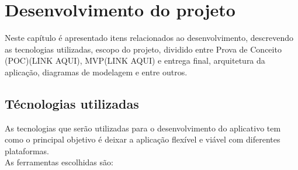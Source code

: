 \chapter{Desenvolvimento do projeto}
Neste capítulo é apresentado itens relacionados ao desenvolvimento, descrevendo as tecnologias utilizadas, escopo do projeto, dividido entre Prova de Conceito (POC)(LINK AQUI), MVP(LINK AQUI) e entrega final, arquitetura da aplicação, diagramas de modelagem e entre outros. \\
\section{Técnologias utilizadas}
As tecnologias que serão utilizadas para o desenvolvimento do aplicativo tem como o principal objetivo é deixar a aplicação flexível e viável com diferentes plataformas.\\
As ferramentas escolhidas são:
